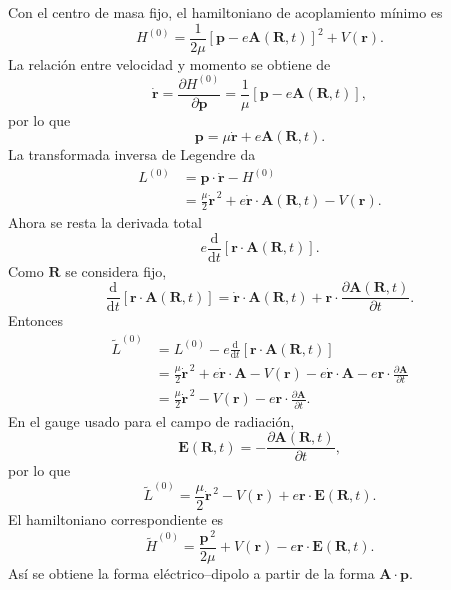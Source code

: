 \documentclass[11pt]{article}
\newcommand{\dd}{\mathrm{d}}
\newcommand{\vb}[1]{\mathbf{#1}}
\begin{document}
Con el centro de masa fijo, el hamiltoniano de acoplamiento m\'inimo es
\begin{equation}
  H^{(0)}
  =
  \frac{1}{2\mu}
  \left[
    \vb p-e\vb A(\vb R,t)
  \right]^2
  +
  V(\vb r).
\end{equation}
La relaci\'on entre velocidad y momento se obtiene de
\begin{equation}
  \dot{\vb r}
  =
  \frac{\partial H^{(0)}}{\partial\vb p}
  =
  \frac{1}{\mu}
  \left[
    \vb p-e\vb A(\vb R,t)
  \right],
\end{equation}
por lo que
\begin{equation}
  \vb p
  =
  \mu\dot{\vb r}
  +
  e\vb A(\vb R,t).
\end{equation}
La transformada inversa de Legendre da
\begin{align}
  L^{(0)}
  &=
  \vb p\cdot\dot{\vb r}-H^{(0)}                                               \\
  &=
  \frac{\mu}{2}\dot{\vb r}^{\,2}
  +
  e\dot{\vb r}\cdot\vb A(\vb R,t)
  -
  V(\vb r).
\end{align}
Ahora se resta la derivada total
\begin{equation}
  e\frac{\dd}{\dd t}\left[\vb r\cdot\vb A(\vb R,t)\right].
\end{equation}
Como \(\vb R\) se considera fijo,
\begin{equation}
  \frac{\dd}{\dd t}\left[\vb r\cdot\vb A(\vb R,t)\right]
  =
  \dot{\vb r}\cdot\vb A(\vb R,t)
  +
  \vb r\cdot
  \frac{\partial\vb A(\vb R,t)}{\partial t}.
\end{equation}
Entonces
\begin{align}
  \tilde L^{(0)}
  &=
  L^{(0)}
  -
  e\frac{\dd}{\dd t}\left[\vb r\cdot\vb A(\vb R,t)\right]                     \\
  &=
  \frac{\mu}{2}\dot{\vb r}^{\,2}
  +
  e\dot{\vb r}\cdot\vb A
  -
  V(\vb r)
  -
  e\dot{\vb r}\cdot\vb A
  -
  e\vb r\cdot\frac{\partial\vb A}{\partial t}                                \\
  &=
  \frac{\mu}{2}\dot{\vb r}^{\,2}
  -
  V(\vb r)
  -
  e\vb r\cdot\frac{\partial\vb A}{\partial t}.
\end{align}
En el gauge usado para el campo de radiaci\'on,
\begin{equation}
  \vb E(\vb R,t)
  =
  -\frac{\partial\vb A(\vb R,t)}{\partial t},
\end{equation}
por lo que
\begin{equation}
  \tilde L^{(0)}
  =
  \frac{\mu}{2}\dot{\vb r}^{\,2}
  -
  V(\vb r)
  +
  e\vb r\cdot\vb E(\vb R,t).
\end{equation}
El hamiltoniano correspondiente es
\begin{equation}
  \tilde H^{(0)}
  =
  \frac{\vb p^{\,2}}{2\mu}
  +
  V(\vb r)
  -
  e\vb r\cdot\vb E(\vb R,t).
\end{equation}
As\'i se obtiene la forma el\'ectrico--dipolo a partir de la forma
\(\vb A\cdot\vb p\).
\end{document}
